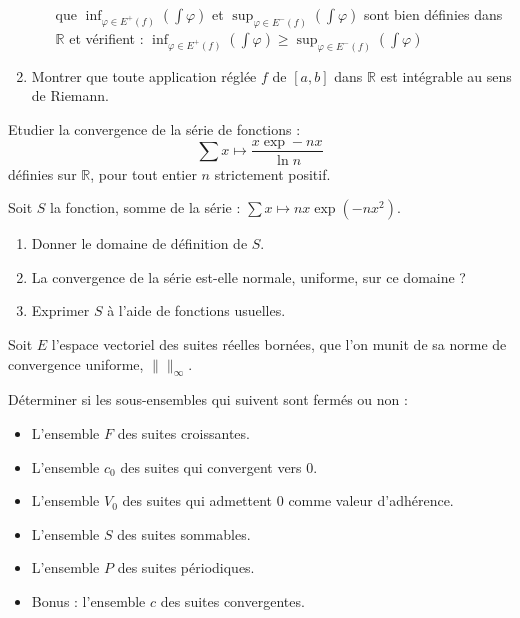 \begin{exer}
\begin{enumerate}
\begin{enumerate}
que $\inf_{\varphi \in E^+(f)}(\int \varphi)$ et $\sup_{\varphi \in E^-(f)}(\int \varphi)$ %
sont bien définies dans $\mathbb{R}$ et vérifient : %
$\inf_{\varphi \in E^+(f)}(\int \varphi) \geq \sup_{\varphi \in E^-(f)}(\int \varphi)$
\end{enumerate}
\item Montrer que toute application réglée $f$ de $[a,b]$ dans $\mathbb{R}$ est intégrable au sens de Riemann.
\end{enumerate}
\end{exer}

\begin{exer}
Etudier la convergence de la s\'erie de fonctions :
\[\sum x\mapsto \frac{x\exp -nx}{\ln n}\]
d\'efinies sur $\mathbb{R}$, pour tout entier $n$ strictement positif.
\end{exer}

\begin{exer}
Soit $S$ la fonction, somme de la s\'erie : $\sum x\mapsto nx\exp(-nx^2)$. 
\begin{enumerate}
\item Donner le domaine de d\'efinition de $S$.
\item La convergence de la s\'erie est-elle normale, uniforme, sur ce domaine ?
\item Exprimer $S$ \`a l'aide de fonctions usuelles.
\end{enumerate}
\end{exer}

\begin{exer}
Soit $E$ l'espace vectoriel des suites r\'eelles born\'ees, %
que l'on munit de sa norme de convergence uniforme, $\| \|_{\infty}$.

D\'eterminer si les sous-ensembles qui suivent sont ferm\'es ou non :
\begin{itemize}
\item L'ensemble $F$ des suites croissantes.
\item L'ensemble $c_0$ des suites qui convergent vers $0$.
\item L'ensemble $V_0$ des suites qui admettent $0$ comme valeur d'adh\'erence.
\item L'ensemble $S$ des suites sommables.
\item L'ensemble $P$ des suites p\'eriodiques.
\item Bonus : l'ensemble $c$ des suites convergentes.
\end{itemize}
\end{exer}

